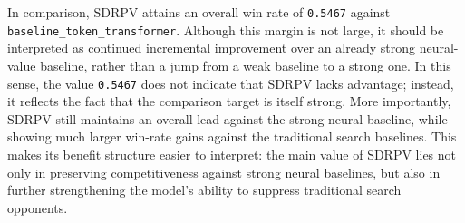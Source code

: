 In comparison, SDRPV attains an overall win rate of \texttt{0.5467} against \texttt{baseline_token_transformer}. Although this margin is not large, it should be interpreted as continued incremental improvement over an already strong neural-value baseline, rather than a jump from a weak baseline to a strong one. In this sense, the value \texttt{0.5467} does not indicate that SDRPV lacks advantage; instead, it reflects the fact that the comparison target is itself strong. More importantly, SDRPV still maintains an overall lead against the strong neural baseline, while showing much larger win-rate gains against the traditional search baselines. This makes its benefit structure easier to interpret: the main value of SDRPV lies not only in preserving competitiveness against strong neural baselines, but also in further strengthening the model's ability to suppress traditional search opponents.



